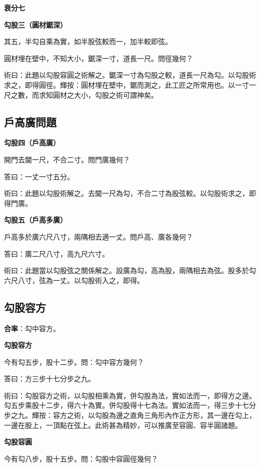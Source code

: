 \documentclass[11pt,a4paper]{article}
\newenvironment{problemenv}[1]{%
  \medskip\noindent\textbf{#1}\par\nopagebreak\smallskip
}{\medskip}
\begin{document}
\begin{problemenv}{衰分七}
\begin{problemenv}{勾股三（圓材鋸深）}
其五，半勾自乘為實，如半股弦較而一，加半較即弦。

圓材埋在壁中，不知大小，鋸深一寸，道長一尺。問徑幾何？

\textsf{術曰：}此題以勾股容圓之術解之。鋸深一寸為勾股之較，道長一尺為勾。以勾股術求之，即得圓徑。輝按：圓材埋在壁中，鋸而測之，此工匠之所常用也。以一寸一尺之數，而求知圓材之大小，勾股之術可謂神矣。
\end{problemenv}

\subsection{戶高廣問題}

\begin{problemenv}{勾股四（戶高廣）}
開門去閫一尺，不合二寸。問門廣幾何？

\textsf{答曰：}一丈一寸五分。

\textsf{術曰：}此題以勾股術解之。去閫一尺為勾，不合二寸為股弦較。以勾股術求之，即得門廣。
\end{problemenv}

\begin{problemenv}{勾股五（戶高多廣）}
戶高多於廣六尺八寸，兩隅相去適一丈。問戶高、廣各幾何？

\textsf{答曰：}廣二尺八寸，高九尺六寸。

\textsf{術曰：}此題當以勾股弦之關係解之。設廣為勾，高為股，兩隅相去為弦。股多於勾六尺八寸，弦為一丈。以勾股術入之，即得。
\end{problemenv}

\subsection{勾股容方}

\textbf{合率}：勾中容方。

\begin{problemenv}{勾股容方}
今有勾五步，股十二步。問：勾中容方幾何？

\textsf{答曰：}方三步十七分步之九。

\textsf{術曰：}勾股容方之術，以勾股相乘為實，併勾股為法，實如法而一，即得方之邊。勾五步乘股十二步，得六十為實。併勾股得十七為法。實如法而一，得三步十七分步之九。輝按：容方之術，以勾股為邊之直角三角形內作正方形，其一邊在勾上，一邊在股上，一頂點在弦上。此術甚為精妙，可以推廣至容圓、容半圓諸題。
\end{problemenv}

\begin{problemenv}{勾股容圓}
今有勾八步，股十五步。問：勾股中容圓徑幾何？


\end{problemenv}
\end{problemenv}
\end{document}
